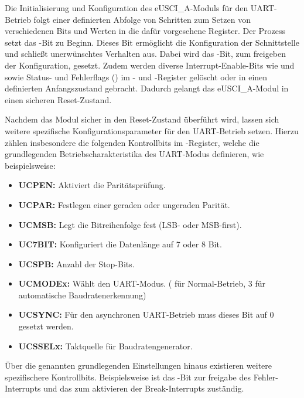 Die Initialisierung und Konfiguration des eUSCI\_A-Moduls f\"ur den UART-Betrieb folgt einer definierten Abfolge von Schritten zum Setzen von verschiedenen Bits und Werten in die daf\"ur vorgesehene Register. Der Prozess setzt das -Bit zu Beginn. Dieses Bit erm\"oglicht die Konfiguration der Schnittstelle und schlie{\ss}t unerw\"unschtes Verhalten aus. Dabei wird das -Bit, zum freigeben der Konfiguration, gesetzt. Zudem werden diverse Interrupt-Enable-Bits wie  und  sowie Status- und Fehlerflags () im - und -Register gel\"oscht oder in einen definierten Anfangszustand gebracht. Dadurch gelangt das eUSCI\_A-Modul in einen sicheren Reset-Zustand. 

Nachdem das Modul sicher in den Reset-Zustand \"uberf\"uhrt wird, lassen sich weitere spezifische Konfigurationsparameter f\"ur den UART-Betrieb setzen. Hierzu z\"ahlen insbesondere die folgenden Kontrollbits im -Register, welche die grundlegenden Betriebscharakteristika des UART-Modus definieren, wie beispielsweise:

\begin{itemize}
	\item \textbf{UCPEN:} Aktiviert die Parit\"atspr\"ufung.
	\item \textbf{UCPAR:} Festlegen einer geraden oder ungeraden Parit\"at.
	\item \textbf{UCMSB:} Legt die Bitreihenfolge fest (LSB- oder MSB-first).
	\item \textbf{UC7BIT:} Konfiguriert die Datenl\"ange auf 7 oder 8 Bit.
	\item \textbf{UCSPB:} Anzahl der Stop-Bits.
	\item \textbf{UCMODEx:} W\"ahlt den UART-Modus. ( f\"ur Normal-Betrieb, 3 f\"ur  automatische Baudratenerkennung)
	\item \textbf{UCSYNC:} F\"ur den asynchronen UART-Betrieb muss dieses Bit auf 0 gesetzt werden.
	\item \textbf{UCSSELx:} Taktquelle f\"ur Baudratengenerator.
\end{itemize}

\"Uber die genannten grundlegenden Einstellungen hinaus existieren weitere spezifischere Kontrollbits. Beispielsweise ist das -Bit zur freigabe des Fehler-Interrupts und das  zum aktivieren der Break-Interrupts zust\"andig. 

